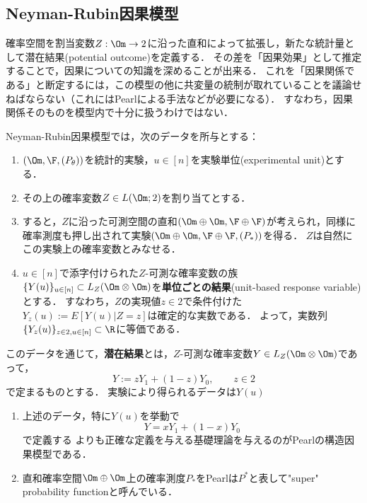 \documentclass[uplatex,dvipdfmx]{jsreport}
\begin{document}
\subsection{Neyman-Rubin因果模型}

\begin{tcolorbox}[colframe=ForestGreen, colback=ForestGreen!10!white,breakable,colbacktitle=ForestGreen!40!white,coltitle=black,fonttitle=\bfseries\sffamily,
title=]
    確率空間を割当変数$Z:\Om\to2$に沿った直和によって拡張し，新たな統計量として潜在結果(potential outcome)を定義する．
    その差を「因果効果」として推定することで，因果についての知識を深めることが出来る．
    これを「因果関係である」と断定するには，この模型の他に共変量の統制が取れていることを議論せねばならない（これにはPearlによる手法などが必要になる）．
    すなわち，因果関係そのものを模型内で十分に扱うわけではない\cite{Pearl-Overview09}．
\end{tcolorbox}

\begin{model}
    Neyman-Rubin因果模型では，次のデータを所与とする：
    \begin{enumerate}
        \item $(\Om,\F,(P_\theta))$を統計的実験，$u\in[n]$を実験単位(experimental unit)とする．
        \item その上の確率変数$Z\in L(\Om;2)$を割り当てとする．
        \item すると，$Z$に沿った可測空間の直和$(\Om\oplus\Om,\F\oplus\F)$が考えられ，同様に確率測度も押し出されて実験$(\Om\oplus\Om,\F\oplus\F,(P_*))$を得る．
        $Z$は自然にこの実験上の確率変数とみなせる．
        \item $u\in[n]$で添字付けられた$Z$-可測な確率変数の族$\{Y(u)\}_{u\in[n]}\subset L_Z(\Om\otimes\Om)$を\textbf{単位ごとの結果}(unit-based response variable)とする．
        すなわち，$Z$の実現値$z\in2$で条件付けた$Y_z(u):=E[Y(u)|Z=z]$は確定的な実数である．
        よって，実数列$\{Y_z(u)\}_{z\in 2,u\in[n]}\subset\R$に等価である．
    \end{enumerate}
    このデータを通じて，\textbf{潜在結果}とは，$Z$-可測な確率変数$Y\in L_Z(\Om\otimes\Om)$であって，
    \[Y:=zY_1+(1-z)Y_0,\qquad z\in2\]
    で定まるものとする．
    実験により得られるデータは$Y(u)$
\end{model}

\begin{remark}\mbox{}
    \begin{enumerate}
        \item 上述のデータ，特に$Y(u)$を挙動で
        \[Y=xY_1+(1-x)Y_0\]
        で定義する
        よりも正確な定義を与える基礎理論を与えるのがPearlの構造因果模型である\cite{Pearl-Overview09}．
        \item 直和確率空間$\Om\oplus\Om$上の確率測度$P_*$をPearlは$P^*$と表して"super" probability functionと呼んでいる．
    \end{enumerate}
\end{remark}
\end{document}

